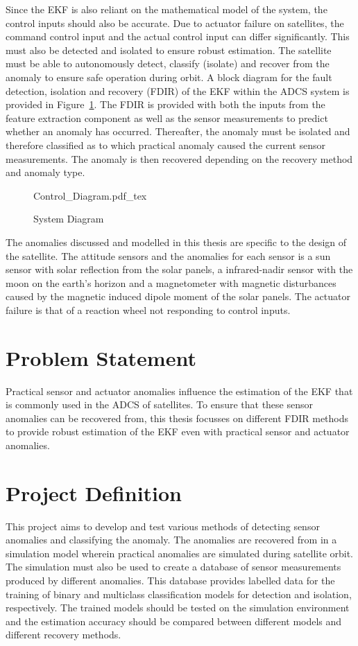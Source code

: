 Since the EKF is also reliant on the mathematical model of the system, the control inputs should also be accurate. Due to actuator failure on satellites, the command control input and the actual control input can differ significantly. This must also be detected and isolated to ensure robust estimation. The satellite must be able to autonomously detect, classify (isolate) and recover from the anomaly to ensure safe operation during orbit. A block diagram for the fault detection, isolation and recovery (FDIR) of the EKF within the ADCS system is provided in Figure~\ref{fig:System_Diagram}. The FDIR is provided with both the inputs from the feature extraction component as well as the sensor measurements to predict whether an anomaly has occurred. Thereafter, the anomaly must be isolated and therefore classified as to which practical anomaly caused the current sensor measurements. The anomaly is then recovered depending on the recovery method and anomaly type.

\begin{figure}[h!b!t]
	\centering
	\def\svgwidth{14cm}
	{Control_Diagram.pdf_tex}
	\caption{System Diagram}
	\label{fig:System_Diagram}
\end{figure}

The anomalies discussed and modelled in this thesis are specific to the design of the satellite. The attitude sensors and the anomalies for each sensor is a sun sensor with solar reflection from the solar panels, a infrared-nadir sensor with the moon on the earth's horizon and a magnetometer with magnetic disturbances caused by the magnetic induced dipole moment of the solar panels. The actuator failure is that of a reaction wheel not responding to control inputs. 

\section{Problem Statement}
Practical sensor and actuator anomalies influence the estimation of the EKF that is commonly used in the ADCS of satellites. To ensure that these sensor anomalies can be recovered from, this thesis focusses on different FDIR methods to provide robust estimation of the EKF even with practical sensor and actuator anomalies.

\section{Project Definition}
This project aims to develop and test various methods of detecting sensor anomalies and classifying the anomaly. The anomalies are recovered from in a simulation model wherein practical anomalies are simulated during satellite orbit. The simulation must also be used to create a database of sensor measurements produced by different anomalies. This database provides labelled data for the training of binary and multiclass classification models for detection and isolation, respectively. The trained models should be tested on the simulation environment and the estimation accuracy should be compared between different models and different recovery methods.

